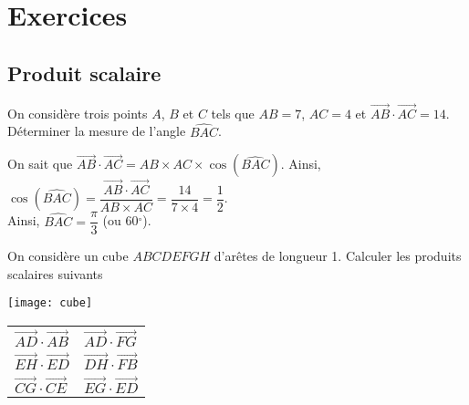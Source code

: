 \documentclass[11pt,fleqn, openany]{book} %
\begin{document}


\chapter{Exercices}

\section*{Produit scalaire}

\begin{exercise}On considère trois points $A$, $B$ et $C$ tels que $AB=7$, $AC=4$ et $\overrightarrow{AB}\cdot \overrightarrow{AC}=14$. Déterminer la mesure de l'angle $\widehat{BAC}$.\end{exercise}

\begin{solution}On sait que $\overrightarrow{AB}\cdot \overrightarrow{AC}=AB \times AC \times \cos (\widehat{BAC})$. Ainsi, $\cos(\widehat{BAC})=\dfrac{\overrightarrow{AB}\cdot \overrightarrow{AC}}{AB \times AC}=\dfrac{14}{7 \times 4}=\dfrac{1}{2}$. \\ Ainsi, $\widehat{BAC}=\dfrac{\pi}{3}$ (ou 60$^{\circ}$).\end{solution}



\begin{exercise}
On considère un cube $ABCDEFGH$ d'arêtes de longueur 1. Calculer les produits scalaires suivants

\begin{minipage}{0.4\linewidth}
\begin{center}
\texttt{[image: cube]}
\end{center}\end{minipage}\hfill \begin{minipage}{0.5\linewidth}

\begin{tabularx}{\linewidth}{XX}
$\overrightarrow{AD} \cdot \overrightarrow{AB}$ & $\overrightarrow{AD} \cdot \overrightarrow{FG}$ \\
$\overrightarrow{EH} \cdot \overrightarrow{ED}$ & $\overrightarrow{DH} \cdot \overrightarrow{FB}$\\
$\overrightarrow{CG} \cdot \overrightarrow{CE}$ & $\overrightarrow{EG} \cdot \overrightarrow{ED}$

\end{tabularx}

\end{minipage}

\end{exercise}
\end{document}
